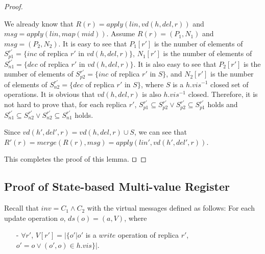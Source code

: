 \begin {proof}
\begin{itemize}
    We already know that $R(r) = \mathit{apply}(\mathit{lin},\mathit{vd}(h,\mathit{del},r))$ and $\mathit{msg} = \mathit{apply}(\mathit{lin},\mathit{map}(\mathit{mid}))$. Assume $R(r) = (P_1,N_1)$ and $\mathit{msg} = (P_2,N_2)$. It is easy to see that $P_1[r']$ is the number of elements of $S_{\mathit{p1}}^{r'} = \{ \mathit{inc}$ of replica $r'$ in $\mathit{vd}(h,\mathit{del},r) \}$, $N_1[r']$ is the number of elements of $S_{\mathit{n1}}^{r'} = \{ \mathit{dec}$ of replica $r'$ in $\mathit{vd}(h,\mathit{del},r) \}$. It is also easy to see that $P_2[r']$ is the number of elements of $S_{\mathit{p2}}^{r'} = \{ \mathit{inc}$ of replica $r'$ in $S \}$, and $N_2[r']$ is the number of elements of $S_{\mathit{n2}}^{r'} = \{ \mathit{dec}$ of replica $r'$ in $S \}$, where $S$ is a $h.\mathit{vis}^{-1}$ closed set of operations. It is obvious that $\mathit{vd}(h,\mathit{del},r)$ is also $h.\mathit{vis}^{-1}$ closed. Therefore, it is not hard to prove that, for each replica $r'$, $S_{\mathit{p1}}^{r'} \subseteq S_{\mathit{p2}}^{r'} \vee S_{\mathit{p2}}^{r'} \subseteq S_{\mathit{p1}}^{r'}$ holds and $S_{\mathit{n1}}^{r'} \subseteq S_{\mathit{n2}}^{r'} \vee S_{\mathit{n2}}^{r'} \subseteq S_{\mathit{n1}}^{r'}$ holds. 
    
    Since $\mathit{vd}(h',\mathit{del}',r) = \mathit{vd}(h,\mathit{del},r) \cup S$, we can see that $R'(r) = \mathit{merge}(R(r),\mathit{msg}) = \mathit{apply}(\mathit{lin}',\mathit{vd}(h',\mathit{del}',r))$. 
\end{itemize}

This completes the proof of this lemma. $\qed$ 
\end {proof}




\subsection{Proof of State-based Multi-value Register}
\label{subsec:appendix proof of state-based multi-value register}

Recall that $\mathit{inv} = C_1 \wedge C_2$ with the virtual messages defined as follows: For each update operation $o$, $\mathit{ds}(o) = (a,V)$, where

\begin{itemize}
\setlength{\itemsep}{0.5pt}
\item[-] $\forall r'$, $V[r'] = \vert \{ o' \vert o'$ is a $\mathit{write}$ operation of replica $r'$, $o' = o \vee (o',o) \in h.\mathit{vis} \} \vert$.
\end{itemize}

